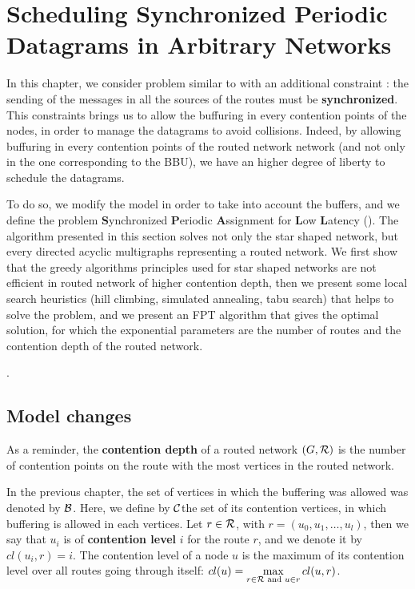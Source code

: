 
\chapter{Scheduling Synchronized Periodic Datagrams in Arbitrary Networks }
\label{chap:SPALL}
\minitoc

In this chapter, we consider problem similar to \pall with an additional constraint : the sending of the messages in all the sources of the routes must be \textbf{synchronized}. This constraints brings us to allow the buffuring in every contention points of the nodes, in order to manage the datagrams to avoid collisions. Indeed, by allowing buffuring in every contention points of the routed network network (and not only in the one corresponding to the BBU), we have an higher degree of liberty to schedule the datagrams.

To do so, we modify the model in order to take into account the buffers, and we define the problem \textbf{S}ynchronized \textbf{P}eriodic \textbf{A}ssignment for \textbf{L}ow \textbf{L}atency (\spall). The algorithm presented in this section solves not only the star shaped network, but every directed acyclic multigraphs representing a routed network. We first show that the greedy algorithms principles used for star shaped networks are not efficient in routed network of higher contention depth, then we present some local search heuristics (hill climbing, simulated annealing, tabu search) that helps to solve the problem, and we present an FPT algorithm that gives the optimal solution, for which the exponential parameters are the number of routes and the contention depth of the routed network.

.


\section{Model changes}
As a reminder, the  \textbf{contention depth} of a routed network $(G,{\cal R})$ is the number of contention points on the route with the most vertices in the routed network. 

In the previous chapter, the set of vertices in which the buffering was allowed was denoted by ${\cal B}$. Here, we define by ${\cal C}$the set of its contention vertices, in which buffering is allowed in each vertices.  
Let $r \in {\cal R}$, with $r = (u_0,u_1,\dots,u_l)$, then we say that $u_i$ is of \textbf{contention level} $i$ for the route $r$, and we denote it by $cl(u_i,r) = i$. The contention level of a node $u$ is the maximum of its contention level over all routes going through itself: 
	$cl(u) = \max\limits_{r\in{\cal R} \text{ and } u \in r} cl(u,r)$.


